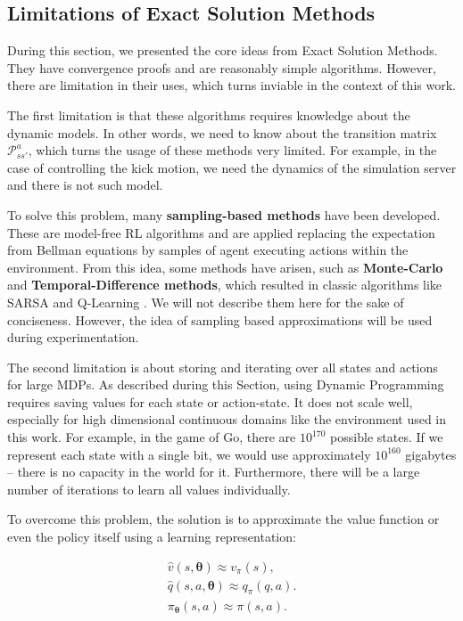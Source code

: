 \subsection{Limitations of Exact Solution Methods}

During this section, we presented the core ideas from Exact Solution Methods. They have convergence proofs and are reasonably simple algorithms. However, there are limitation in their uses, which turns inviable in the context of this work.

The first limitation is that these algorithms requires knowledge about the dynamic models. In other words, we need to know about the transition matrix $\mathcal{P}_{ss'}^a$, which turns the usage of these methods very limited. For example, in the case of controlling the kick motion, we need the dynamics of the simulation server and there is not such model.

To solve this problem, many \textbf{sampling-based methods} have been developed. These are model-free RL algorithms and are applied replacing the expectation from Bellman equations by samples of agent executing actions within the environment. From this idea, some methods have arisen, such as \textbf{Monte-Carlo} and \textbf{Temporal-Difference methods}, which resulted in classic algorithms like SARSA \cite{Rummery94on-lineq-learning} and Q-Learning \cite{Watkins:1989}. We will not describe them here for the sake of conciseness. However, the idea of sampling based approximations will be used during experimentation.

The second limitation is about storing and iterating over all states and actions for large MDPs. As described during this Section, using Dynamic Programming requires saving values for each state or action-state. It does not scale well, especially for high dimensional continuous domains like the environment used in this work. For example, in the game of Go, there are $10^{170}$ possible states. If we represent each state with a single bit, we would use approximately $10^{160}$ gigabytes -- there is no capacity in the world for it. Furthermore, there will be a large number of iterations to learn all values individually.

To overcome this problem, the solution is to approximate the value function or even the policy itself using a learning representation:

\begin{align}
\hat v (s, \boldsymbol{\theta} ) \approx v_\pi(s), \\
\hat q (s, a, \boldsymbol{\theta}) \approx q_\pi(q,a). \\
\pi_{\boldsymbol{\theta}}(s,a) \approx \pi(s,a).
\end{align}


